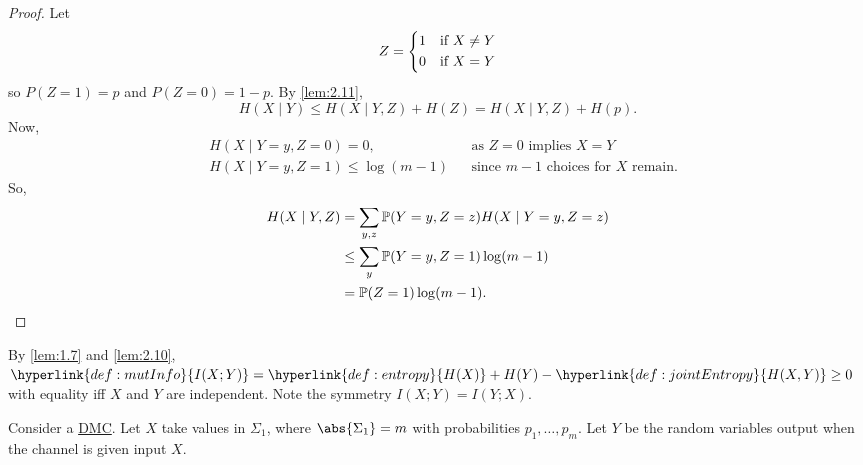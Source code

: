 \documentclass{article}
\newcommand{\Prob}{\mathbb{P}}
\newcommand{\1}[1]{\mathbbm{1}_{#1}}
\begin{document}
\begin{proof}
    Let
    \begin{equation*}
        Z =
        \begin{dcases}
            1 & \text{if } X \neq Y \\
            0 & \text{if } X = Y \\
        \end{dcases}
    \end{equation*}
    so $P(Z=1)=p$ and $P(Z=0) = 1-p$.
    By \cref{lem:2.11},
    \begin{equation*}H(X \mid Y) \leq H(X \mid Y, Z) + H(Z) = H(X \mid Y, Z) + H(p).\end{equation*}
    Now,
    \begin{align*}
        &H(X \mid Y = y, Z=0)=0, &&\text{as $Z=0$ implies $X = Y$}\\
        &H(X \mid Y = y, Z=1) \leq \log(m-1) &&\text{since $m-1$ choices for $X$ remain.}
    \end{align*}
    So,
    \begin{align*}
        H(X \mid Y, Z) &= \sum_{y, z} \Prob(Y=y, Z=z) H(X \mid Y=y, Z=z) \\
                    &\leq \sum_y \Prob(Y=y, Z=1) \log(m-1)  \\
                    &= \Prob(Z=1) \log(m-1). \qedhere
    \end{align*}
\end{proof}


By \cref{lem:1.7} and \cref{lem:2.10}, $\hyperlink{def:mutInfo}{I(X;Y)} = \hyperlink{def:entropy}{H(X)} + H(Y) - \hyperlink{def:jointEntropy}{H(X,Y)} \geq 0$ with equality iff $X$ and $Y$ are independent.
Note the symmetry $I(X;Y) = I(Y;X)$.

Consider a \hyperlink{def:dmc}{DMC}. Let $X$ take values in $\Sigma_1$, where $\abs{\Sigma_1} = m$ with probabilities $p_1, \dotsc, p_m$.
Let $Y$ be the random variables output when the channel is given input $X$.

\end{document}
